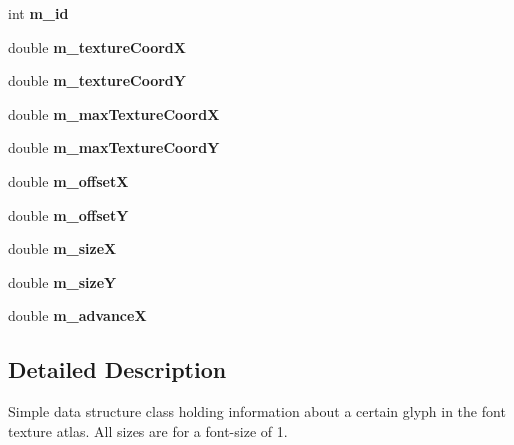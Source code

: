 \begin{DoxyCompactItemize}
\item 
\mbox{\label{class_flounder_1_1_character_a84e2c257cf4252bf4bab0813d5f4e466}} 
int {\bfseries m\+\_\+id}
\item 
\mbox{\label{class_flounder_1_1_character_ac617e28397192f2fb96c1b4d84deace7}} 
double {\bfseries m\+\_\+texture\+CoordX}
\item 
\mbox{\label{class_flounder_1_1_character_adba68750502d336ce60888b512596674}} 
double {\bfseries m\+\_\+texture\+CoordY}
\item 
\mbox{\label{class_flounder_1_1_character_adc6f6bbb0688f1d24e34dc900d799b80}} 
double {\bfseries m\+\_\+max\+Texture\+CoordX}
\item 
\mbox{\label{class_flounder_1_1_character_ae3bf5d3307995c5a97320ca7fc2bdb68}} 
double {\bfseries m\+\_\+max\+Texture\+CoordY}
\item 
\mbox{\label{class_flounder_1_1_character_ac4ea82485f8003532dc037d48dcd55a1}} 
double {\bfseries m\+\_\+offsetX}
\item 
\mbox{\label{class_flounder_1_1_character_ac22867fbe81071809502a2e2577bad72}} 
double {\bfseries m\+\_\+offsetY}
\item 
\mbox{\label{class_flounder_1_1_character_a4a272ccfe68839f148ad559ba29acb82}} 
double {\bfseries m\+\_\+sizeX}
\item 
\mbox{\label{class_flounder_1_1_character_a7885d2a7bcb45eb1a8a5e82fc3aaae25}} 
double {\bfseries m\+\_\+sizeY}
\item 
\mbox{\label{class_flounder_1_1_character_ad25b8d0f926ff4cdfad428b560950fb5}} 
double {\bfseries m\+\_\+advanceX}
\end{DoxyCompactItemize}


\subsection{Detailed Description}
Simple data structure class holding information about a certain glyph in the font texture atlas. All sizes are for a font-\/size of 1. 



